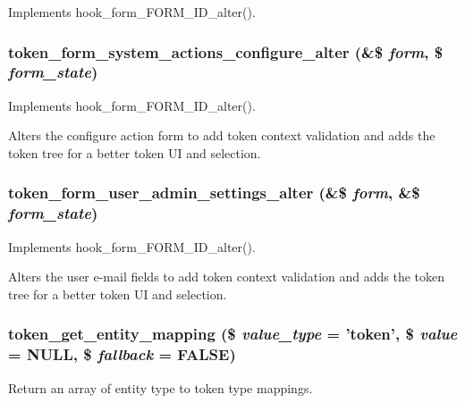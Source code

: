 \label{token_8module_aafd876aa871c14cf1c4ed7cc130a7fef}
Implements hook\_\-form\_\-FORM\_\-ID\_\-alter(). \hypertarget{token_8module_a9e90ed1423fef7afcb0f3283cf9fc7c8}{
\subsubsection[{token\_\-form\_\-system\_\-actions\_\-configure\_\-alter}]{\setlength{\rightskip}{0pt plus 5cm}token\_\-form\_\-system\_\-actions\_\-configure\_\-alter (\&\$ {\em form}, \/  \$ {\em form\_\-state})}}
\label{token_8module_a9e90ed1423fef7afcb0f3283cf9fc7c8}
Implements hook\_\-form\_\-FORM\_\-ID\_\-alter().

Alters the configure action form to add token context validation and adds the token tree for a better token UI and selection. \hypertarget{token_8module_a1631840450884761bfdf41635e55700d}{
\subsubsection[{token\_\-form\_\-user\_\-admin\_\-settings\_\-alter}]{\setlength{\rightskip}{0pt plus 5cm}token\_\-form\_\-user\_\-admin\_\-settings\_\-alter (\&\$ {\em form}, \/  \&\$ {\em form\_\-state})}}
\label{token_8module_a1631840450884761bfdf41635e55700d}
Implements hook\_\-form\_\-FORM\_\-ID\_\-alter().

Alters the user e-\/mail fields to add token context validation and adds the token tree for a better token UI and selection. \hypertarget{token_8module_a44ada8bf0431313606adce0148b29b82}{
\subsubsection[{token\_\-get\_\-entity\_\-mapping}]{\setlength{\rightskip}{0pt plus 5cm}token\_\-get\_\-entity\_\-mapping (\$ {\em value\_\-type} = {\ttfamily 'token'}, \/  \$ {\em value} = {\ttfamily NULL}, \/  \$ {\em fallback} = {\ttfamily FALSE})}}
\label{token_8module_a44ada8bf0431313606adce0148b29b82}
Return an array of entity type to token type mappings.

